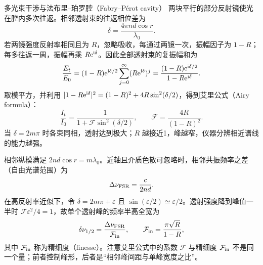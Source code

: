 \begin{starread}{多光束干涉与法布里--珀罗腔（Fabry--P\'erot cavity）}
两块平行的部分反射镜使光在腔内多次往返。相邻透射束的往返相位差为
\[
 \delta=\frac{4\pi nd\cos r}{\lambda_0}.
\]
若两镜强度反射率相同且为 $R$，忽略吸收，每通过两镜一次，振幅因子为 $1-R$；
每多往返一周，振幅再乘 $R\mathrm e^{\mathrm i\delta}$。因此全部透射束的复振幅和为
\[
 \frac{E_t}{E_0}
 =(1-R)\mathrm e^{\mathrm i\delta/2}
 \sum_{j=0}^{\infty}(R\mathrm e^{\mathrm i\delta})^j
 =\frac{(1-R)\mathrm e^{\mathrm i\delta/2}}{1-R\mathrm e^{\mathrm i\delta}}.
\]
取模平方，并利用
$|1-R\mathrm e^{\mathrm i\delta}|^2=(1-R)^2+4R\sin^2(\delta/2)$，得到艾里公式（Airy formula）：
\[
 \frac{I_t}{I_0}=\frac1{1+\mathcal F\sin^2(\delta/2)},
 \qquad \mathcal F=\frac{4R}{(1-R)^2}.
\]
当 $\delta=2m\pi$ 时各束同相，透射达到极大；$R$ 越接近1，峰越窄，仪器分辨相近谱线的能力越强。

\begin{center}\begin{minipage}{\linewidth}\centering
{}
\end{minipage}\end{center}

相邻纵模满足 $2nd\cos r=m\lambda_0$。近轴且介质色散可忽略时，相邻共振频率之差（自由光谱范围）为
\[
 \Delta\nu_{\rm FSR}=\frac{c}{2nd}.
\]
在高反射率近似下，令 $\delta=2m\pi+\varepsilon$ 且
$\sin(\varepsilon/2)\simeq\varepsilon/2$。透射强度降到峰值一半时
$\mathcal F\varepsilon^2/4=1$，故单个透射峰的频率半高全宽为
\[
 \delta\nu_{1/2}=\frac{\Delta\nu_{\rm FSR}}{\mathcal F_{\rm in}},
 \qquad
 \mathcal F_{\rm in}=\frac{\pi\sqrt R}{1-R},
\]
其中 $\mathcal F_{\rm in}$ 称为精细度（finesse）。注意艾里公式中的系数 $\mathcal F$ 与精细度
$\mathcal F_{\rm in}$ 不是同一个量；前者控制峰形，后者是“相邻峰间距与单峰宽度之比”。


\end{starread}
